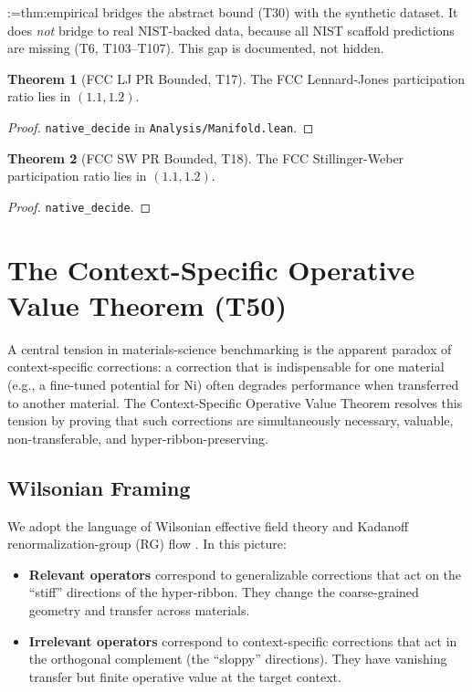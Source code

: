 \documentclass[11pt,a4paper]{article}
\makeatletter
\newcommand{\cref}[1]{\begingroup\def\crefsep{}\@for\crefitem:=#1\do{\crefsep\ref{\crefitem}\def\crefsep{, }}\endgroup}
\newcommand{\Cref}[1]{\cref{#1}}
\theoremstyle{definition}
\newtheorem{theorem}{Theorem}[section]
\theoremstyle{plain}
\makeatother
\begin{document}
\Cref{thm:empirical} bridges the abstract bound (T30) with the synthetic dataset. It does \emph{not} bridge to real NIST-backed data, because all NIST scaffold predictions are missing (T6, T103--T107). This gap is documented, not hidden.

\begin{theorem}[FCC LJ PR Bounded, T17]
\label{thm:fcclj}
The FCC Lennard-Jones participation ratio lies in $(1.1, 1.2)$.
\end{theorem}
\begin{proof}
\texttt{native\_decide} in \texttt{Analysis/Manifold.lean}.
\end{proof}

\begin{theorem}[FCC SW PR Bounded, T18]
\label{thm:fccsw}
The FCC Stillinger-Weber participation ratio lies in $(1.1, 1.2)$.
\end{theorem}
\begin{proof}
\texttt{native\_decide}.
\end{proof}

\section{The Context-Specific Operative Value Theorem (T50)}
\label{sec:t50}

A central tension in materials-science benchmarking is the apparent paradox of context-specific corrections: a correction that is indispensable for one material (e.g., a fine-tuned potential for Ni) often degrades performance when transferred to another material. The Context-Specific Operative Value Theorem resolves this tension by proving that such corrections are simultaneously necessary, valuable, non-transferable, and hyper-ribbon-preserving.

\subsection{Wilsonian Framing}
\label{subsec:wilson}

We adopt the language of Wilsonian effective field theory and Kadanoff renormalization-group (RG) flow \cite{wilson1974renormalization}. In this picture:
\begin{itemize}
\item \textbf{Relevant operators} correspond to generalizable corrections that act on the ``stiff'' directions of the hyper-ribbon. They change the coarse-grained geometry and transfer across materials.
\item \textbf{Irrelevant operators} correspond to context-specific corrections that act in the orthogonal complement (the ``sloppy'' directions). They have vanishing transfer but finite operative value at the target context.
\end{itemize}
\end{document}
